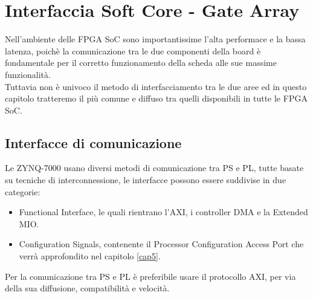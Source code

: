 \chapter{Interfaccia Soft Core - Gate Array}
\label{comunicazioneCap}
Nell'ambiente delle FPGA SoC sono importantissime l'alta performace e la bassa latenza, poichè la comunicazione tra le due componenti della board è fondamentale per il corretto funzionamento della scheda alle sue massime funzionalità.\\
Tuttavia non è univoco il metodo di interfacciamento tra le due aree ed in questo capitolo tratteremo il più comune e diffuso tra quelli disponibili in tutte le FPGA SoC.
\section{Interfacce di comunicazione}
Le ZYNQ-7000 usano diversi metodi di comunicazione tra PS e PL, tutte basate su tecniche di interconnessione, le interfacce possono essere suddivise in due categorie\cite{Doc}:
\begin{itemize}
    \item Functional Interface, le quali rientrano l'AXI, i controller DMA e la Extended MIO.
    \item Configuration Signals, contenente il Processor Configuration Access Port che verrà approfondito nel capitolo \ref{cap5}.
\end{itemize}
Per la comunicazione tra PS e PL è preferibile usare il protocollo AXI, per via della sua diffusione, compatibilità e velocità.
